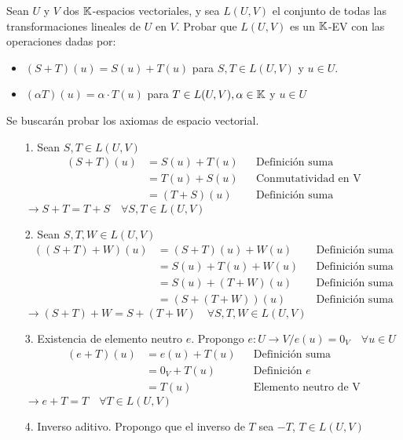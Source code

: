 \item Sean $U$ y $V$ dos $\mathbb{K}$-espacios vectoriales, y sea $L(U,V)$ el conjunto de todas las transformaciones lineales de $U$ en $V$. Probar que $L(U,V)$ es un $\mathbb{K}$-EV con las operaciones dadas por:
    \begin{itemize}
        \item $(S+T)(u)=S(u)+T(u)$ para $S,T\in L(U,V)$ y $u\in U$.
        \item $(\alpha T)(u)=\alpha\cdot T(u)$ para $T\in L(U,V),\alpha\in\mathbb{K}$ y $u\in U$
    \end{itemize}
    \begin{mdframed}[style=s]
        Se buscarán probar los axiomas de espacio vectorial.
        \begin{enumerate}
            \item[1.] Sean $S,T\in L(U,V)$
                \begin{align*}
                    (S+T)(u)&=S(u)+T(u)&&\text{Definición suma}\\
                    &=T(u)+S(u)&&\text{Conmutatividad en V}\\
                    &=(T+S)(u)&&\text{Definición suma}
                \end{align*}
                $\to S+T=T+S\quad\forall S,T\in L(U,V)$
            \item[2.] Sean $S,T,W\in L(U,V)$
                \begin{align*}
                    ((S+T)+W)(u)&=(S+T)(u)+W(u)&&\text{Definición suma}\\
                    &=S(u)+T(u)+W(u)&&\text{Definición suma}\\
                    &=S(u)+(T+W)(u)&&\text{Definición suma}\\
                    &=(S+(T+W))(u)&&\text{Definición suma}
                \end{align*}
                $\to(S+T)+W=S+(T+W)\quad\forall S,T,W\in L(U,V)$
            \item[3.] Existencia de elemento neutro $e$. Propongo $e:U\to V/e(u)=0_V\quad\forall u\in U$
                \begin{align*}
                    (e+T)(u)&=e(u)+T(u)&&\text{Definición suma}\\
                    &=0_V+T(u)&&\text{Definición $e$}\\
                    &=T(u)&&\text{Elemento neutro de V}
                \end{align*}
                $\to e+T=T\quad\forall T\in L(U,V)$
            \item[4.] Inverso aditivo. Propongo que el inverso de $T$ sea $-T$, $T\in L(U,V)$

\end{enumerate}
\end{mdframed}

